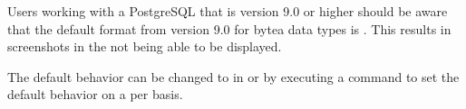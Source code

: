 Users working with a PostgreSQL \gddb{} that is version 9.0 or higher should be aware that the default format from version 9.0 for bytea data types is . This results in screenshots in the \gddb{} not being able to be displayed. 

The default behavior can be changed to  in  or by executing a command to set the default behavior on a per \gddb{} basis. 


